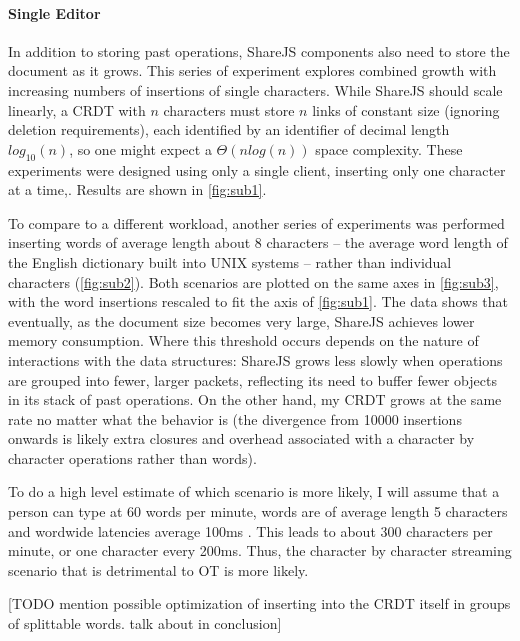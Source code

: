 \documentclass[12pt,a4paper,twoside,openright]{report}
\begin{document}
			\paragraph{Single Editor}
				In addition to storing past operations, ShareJS components also need to store the document as it grows. This series of experiment explores combined growth with increasing numbers of insertions of single characters. While ShareJS should scale linearly, a CRDT with $n$ characters must store $n$ links of constant size (ignoring deletion requirements), each identified by an identifier of decimal length $log_{10}(n)$, so one might expect a $\Theta (nlog(n))$ space complexity. These experiments were designed using only a single client, inserting only one character at a time,. Results are shown in \ref{fig:sub1}.
					
				To compare to a different workload, another series of experiments was performed inserting words of average length about 8 characters -- the average word length of the English dictionary built into UNIX systems -- rather than individual characters (\ref{fig:sub2}). Both scenarios are plotted on the same axes in \ref{fig:sub3}, with the word insertions rescaled to fit the axis of \ref{fig:sub1}. The data shows that eventually, as the document size becomes very large, ShareJS achieves lower memory consumption. Where this threshold occurs depends on the nature of interactions with the data structures: ShareJS grows less slowly when operations are grouped into fewer, larger packets, reflecting its need to buffer fewer objects in its stack of past operations. On the other hand, my CRDT grows at the same rate no matter what the behavior is (the divergence from 10000 insertions onwards is likely extra closures and overhead associated with a character by character operations rather than words). 
				
				To do a high level estimate of which scenario is more likely, I will assume that a person can type at 60 words per minute, words are of average length 5 characters \cite{bochkarev2012average} and wordwide latencies average 100ms \cite{latencies} \cite{fccbroadband}. This leads to about 300 characters per minute, or one character every 200ms. Thus, the character by character streaming scenario that is detrimental to OT is more likely.
				
				[TODO mention possible optimization of inserting into the CRDT itself in groups of splittable words. talk about in conclusion]
				
\end{document}
